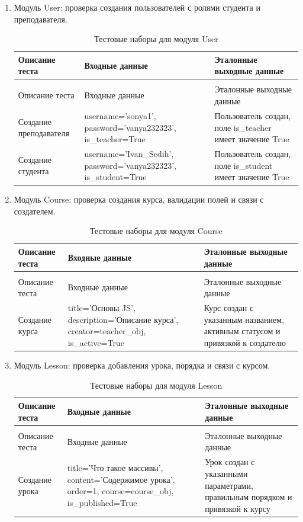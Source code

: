 \begin{enumerate}
	\item Модуль User: проверка создания пользователей с ролями студента и преподавателя.
	\begin{xltabular}{\textwidth}{|p{3cm}|p{6cm}|p{6cm}|}
		\caption{Тестовые наборы для модуля User\label{tab:user_tests}}\\
		\hline
		Описание теста & Входные данные & Эталонные выходные данные \\ \hline
		\endfirsthead
		\\
		\hline
		Описание теста & Входные данные & Эталонные выходные данные \\ \hline
		\endhead
		Создание преподавателя & username='sonya1', password='vanya232323', is\_teacher=True & Пользователь создан, поле is\_teacher имеет значение True \\ \hline
		Создание студента & username='Ivan\_Sedih', password='vanya232323', is\_student=True & Пользователь создан, поле is\_student имеет значение True \\ \hline
	\end{xltabular}
	
	\item Модуль Course: проверка создания курса, валидации полей и связи с создателем.
	\begin{xltabular}{\textwidth}{|p{3cm}|p{6cm}|p{6cm}|}
		\caption{Тестовые наборы для модуля Course\label{tab:course_tests}}\\
		\hline
		Описание теста & Входные данные & Эталонные выходные данные \\ \hline
		\endfirsthead
		\\
		\hline
		Описание теста & Входные данные & Эталонные выходные данные \\ \hline
		\endhead
		Создание курса & title='Основы JS', description='Описание курса', creator=teacher\_obj, is\_active=True & Курс создан с указанным названием, активным статусом и привязкой к создателю \\ \hline
	\end{xltabular}
	
	\item Модуль Lesson: проверка добавления урока, порядка и связи с курсом.
	\begin{xltabular}{\textwidth}{|p{3cm}|p{6cm}|p{6cm}|}
		\caption{Тестовые наборы для модуля Lesson\label{tab:lesson_tests}}\\
		\hline
		Описание теста & Входные данные & Эталонные выходные данные \\ \hline
		\endfirsthead
		\\
		\hline
		Описание теста & Входные данные & Эталонные выходные данные \\ \hline
		\endhead
		Создание урока & title='Что такое массивы', content='Содержимое урока', order=1, course=course\_obj, is\_published=True & Урок создан с указанными параметрами, правильным порядком и привязкой к курсу \\ \hline
	\end{xltabular}
	

\end{enumerate}
